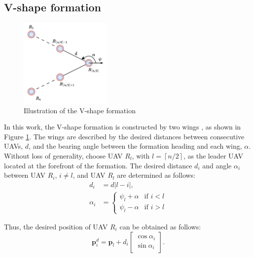 \subsection{V-shape formation}
\begin{figure}
    \centering
    \includegraphics[width=0.4\textwidth]{paper1/images/v-shape.pdf}
    \caption{Illustration of the V-shape formation}
    \label{fig:chap2_vshape}
\end{figure}
In this work, the V-shape formation is constructed by two wings \cite{Dang2019}, as shown in Figure \ref{fig:chap2_vshape}. The wings are described by the desired distances between consecutive UAVs, $d$, and the bearing angle between the formation heading and each wing, $\alpha$. Without loss of generality, choose UAV $R_l$, with $l=\left\lceil{n}/{2}\right\rceil$, as the leader UAV located at the forefront of the formation. The desired distance $d_i$ and angle $\alpha_i$ between UAV $R_i$, $i\neq l$, and UAV $R_l$ are determined as follows:
\begin{equation}
\begin{aligned}
    d_i&=d\left\vert l-i\right\vert,\\
    \alpha_{i}&=\left\{ \begin{array}{cc}
\psi_{l}+\alpha & \text{if }i<l\\
\psi_{l}-\alpha & \text{if }i>l
\end{array}\right.
\end{aligned}
\label{eqn:chap2_desired}
\end{equation}

Thus, the desired position of UAV $R_i$ can be obtained as follows:
\begin{equation}
    \mathbf{p}_i^d=\mathbf{p}_l+d_i\left[\begin{array}{c}
\cos\alpha_{i}\\
\sin\alpha_{i}
\end{array}\right].
\label{eqn:chap2_desired_pose}
\end{equation}